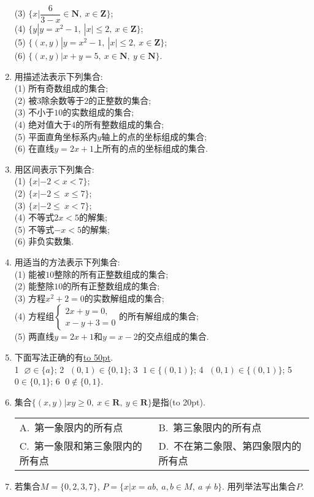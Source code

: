 \documentclass[10pt,a4paper]{article}
\newcommand{\blank}[1]{\underline{\hbox to #1pt{}}}
\newcommand{\bracket}[1]{(\hbox to #1pt{})}
\newcommand{\twoch}[4]{\par\begin{tabular}{p{.46\textwidth}p{.46\textwidth}}
A.~#1& B.~#2\\
C.~#3& D.~#4
\end{tabular}}
\begin{document}
\begin{enumerate}[1.]
(3) $\{x|\dfrac 6{3-x}\in\mathbf{N}, \ x\in\mathbf{Z}\}$;\\
(4) $\{y|y=x^2-1 , \ |x| \le 2, \ x\in\mathbf{Z}\}$;\\
(5) $\{( x,y)|y=x^2-1,\ |x|\le 2, \ x\in\mathbf{Z}\}$;\\
(6) $\{( x,y)|x +y=5, \ x\in\mathbf{N}, \ y\in\mathbf{N}\}$.
\item 用描述法表示下列集合:\\
(1) 所有奇数组成的集合;\\
(2) 被$3$除余数等于$2$的正整数的集合;\\
(3) 不小于$10$的实数组成的集合;\\
(4) 绝对值大于$4$的所有整数组成的集合;\\
(5) 平面直角坐标系内$y$轴上的点的坐标组成的集合;\\
(6) 在直线$y=2x+1$上所有的点的坐标组成的集合.
\item 用区间表示下列集合:\\
(1) $\{x|-2<x<7\}$;\\
(2) $\{x|-2\le\ x\le7\}$;\\
(3) $\{x|-2\le\ x<7\}$;\\
(4) 不等式$2x<5$的解集;\\
(5) 不等式$-x<5$的解集; \\
(6) 非负实数集.
\item 用适当的方法表示下列集合:\\
(1) 能被$10$整除的所有正整数组成的集合;\\
(2) 能整除$10$的所有正整数组成的集合;\\
(3) 方程$x^2+2=0$的实数解组成的集合;\\
(4) 方程组$\begin{cases}2x+y=0, \\ x-y+3=0\end{cases}$的所有解组成的集合;\\
(5) 两直线$y=2x+1$和$y=x-2$的交点组成的集合.
\item 下面写法正确的有\blank{50}.\\
\textcircled{1} $\varnothing\in\{a\}$; \textcircled{2} $(0, 1)\in\{0, 1\}$; \textcircled{3} $1 \in \{(0,1)\}$; \textcircled{4} $(0,1) \in \{(0,1)\}$; \textcircled{5} $0\in \{0,1\}$; \textcircled{6} $0 \notin \{0,1\}$.
\item 集合$\{(x, y)|xy\ge 0,\  x\in\mathbf{R},\  y\in\mathbf{R}\}$是指\bracket{20}.
\twoch{第一象限内的所有点}{第三象限内的所有点}{第一象限和第三象限内的所有点}{不在第二象限、第四象限内的所有点}
\item 若集合$M=\{0,2,3,7\}$, $P=\{x|x=ab,\ a,b\in M, \ a\ne b\}$. 用列举法写出集合$P$.

\end{enumerate}
\end{document}
